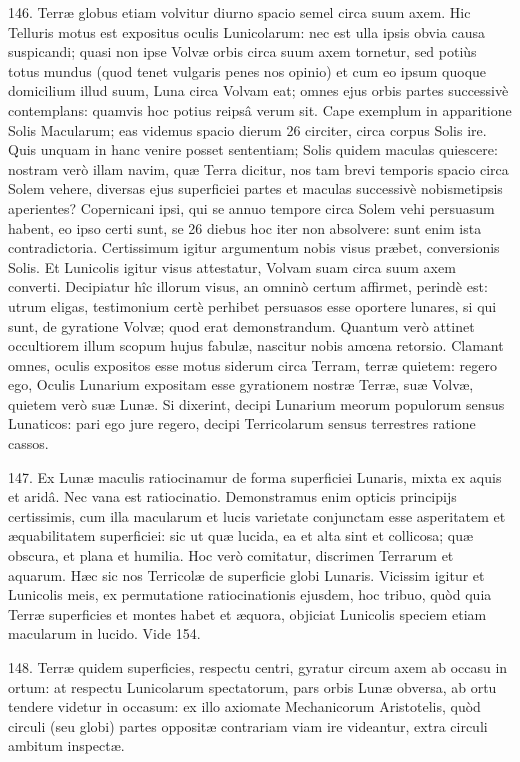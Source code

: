 \documentclass[a4paper, 11pt, oneside, polutonikogreek, german]{article}
\begin{document}
146. Terræ globus etiam volvitur diurno spacio semel circa suum axem. Hic Telluris motus est expositus oculis Lunicolarum: nec est ulla ipsis obvia causa suspicandi; quasi non ipse Volvæ orbis circa suum axem tornetur, sed potiùs totus mundus (quod tenet vulgaris penes nos opinio) et cum eo ipsum quoque domicilium illud suum, Luna circa Volvam eat; omnes ejus orbis partes successivè contemplans: quamvis hoc potius reipsâ verum sit. Cape exemplum in apparitione Solis Macularum; eas videmus spacio dierum 26 circiter, circa corpus Solis ire. Quis unquam in hanc venire posset sententiam; Solis quidem maculas quiescere: nostram verò illam navim, quæ Terra dicitur, nos tam brevi temporis spacio circa Solem vehere, diversas ejus superficiei partes et maculas successivè nobismetipsis aperientes? Copernicani ipsi, qui se annuo tempore circa Solem vehi persuasum habent, eo ipso certi sunt, se 26 diebus hoc iter non absolvere: sunt enim ista contradictoria. Certissimum igitur argumentum nobis visus præbet, conversionis Solis. Et Lunicolis igitur visus attestatur, Volvam suam circa suum axem converti. Decipiatur hîc illorum visus, an omninò certum affirmet, perindè est: utrum eligas, testimonium certè perhibet persuasos esse oportere lunares, si qui sunt, de gyratione Volvæ; quod erat demonstrandum. Quantum verò attinet occultiorem illum scopum hujus fabulæ, nascitur nobis amœna retorsio. Clamant omnes, oculis expositos esse motus siderum circa Terram, terræ quietem: regero ego, Oculis Lunarium expositam esse gyrationem nostræ Terræ, suæ Volvæ, quietem verò suæ Lunæ. Si dixerint, decipi Lunarium meorum populorum sensus Lunaticos: pari ego jure regero, decipi Terricolarum sensus terrestres ratione cassos.

147. Ex Lunæ maculis ratiocinamur de forma superficiei Lunaris, mixta ex aquis et aridâ. Nec vana est ratiocinatio. Demonstramus enim opticis principijs certissimis, cum illa macularum et lucis varietate conjunctam esse asperitatem et æquabilitatem superficiei: sic ut quæ lucida, ea et alta sint et collicosa; quæ obscura, et plana et humilia. Hoc verò comitatur, discrimen Terrarum et aquarum. Hæc sic nos Terricolæ de superficie globi Lunaris.\hspace*{5mm}
Vicissim igitur et Lunicolis meis, ex permutatione ratiocinationis ejusdem, hoc tribuo, quòd quia Terræ superficies et montes habet et æquora, objiciat Lunicolis speciem etiam macularum in lucido. Vide 154.

148. Terræ quidem superficies, respectu centri, gyratur circum axem ab occasu in ortum: at respectu Lunicolarum spectatorum, pars orbis Lunæ obversa, ab ortu tendere videtur in occasum: ex illo axiomate Mechanicorum Aristotelis, quòd circuli (seu globi) partes oppositæ contrariam viam ire videantur, extra circuli ambitum inspectæ.
\end{document}
